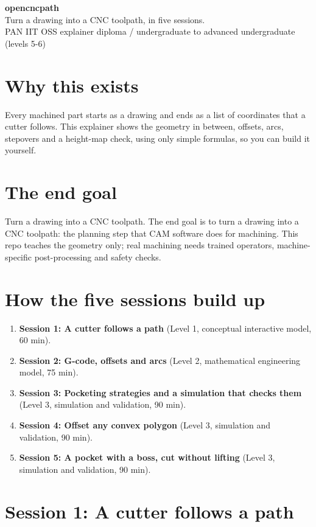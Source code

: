 \documentclass[11pt,a4paper]{article}
\begin{document}
\begin{center}{\LARGE\bfseries opencncpath}\\[0.4em]{\large Turn a drawing into a CNC toolpath, in five sessions.}\\[0.2em]\small PAN IIT OSS explainer \textbullet{} diploma / undergraduate to advanced undergraduate (levels 5-6)\end{center}

\section*{Why this exists}
Every machined part starts as a drawing and ends as a list of coordinates that a cutter follows. This explainer shows the geometry in between, offsets, arcs, stepovers and a height-map check, using only simple formulas, so you can build it yourself.

\section*{The end goal}
Turn a drawing into a CNC toolpath. The end goal is to turn a drawing into a CNC toolpath: the planning step that CAM software does for machining. This repo teaches the geometry only; real machining needs trained operators, machine-specific post-processing and safety checks.

\section*{How the five sessions build up}
\begin{enumerate}[nosep]
\item \textbf{Session 1: A cutter follows a path} (Level 1, conceptual interactive model, 60 min).
\item \textbf{Session 2: G-code, offsets and arcs} (Level 2, mathematical engineering model, 75 min).
\item \textbf{Session 3: Pocketing strategies and a simulation that checks them} (Level 3, simulation and validation, 90 min).
\item \textbf{Session 4: Offset any convex polygon} (Level 3, simulation and validation, 90 min).
\item \textbf{Session 5: A pocket with a boss, cut without lifting} (Level 3, simulation and validation, 90 min).
\end{enumerate}

\section{Session 1: A cutter follows a path}
\end{document}
